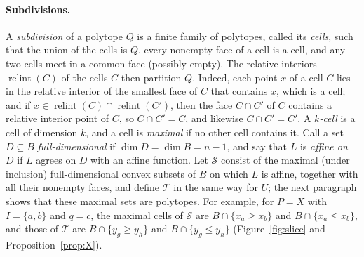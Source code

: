 \documentclass[11pt]{article}
\theoremstyle{definition}
\theoremstyle{remark}
\newcommand{\SSS}{\mathcal S}
\newcommand{\TT}{\mathcal T}
\newcommand{\relint}{\operatorname{relint}}
\begin{document}
\paragraph{Subdivisions.}
A \emph{subdivision} of a polytope $Q$ is a finite family of polytopes, called its \emph{cells}, such that the union of the cells is $Q$, every nonempty face of a cell is a cell, and any two cells meet in a common face (possibly empty). The relative interiors $\relint(C)$ of the cells $C$ then partition $Q$. Indeed, each point $x$ of a cell $C$ lies in the relative interior of the smallest face of $C$
that contains $x$, which is a cell; and if $x\in\relint(C)\cap\relint(C')$, then the face $C\cap C'$ of $C$
contains a relative interior point of $C$, so $C\cap C'=C$, and likewise $C\cap C'=C'$. A \emph{$k$-cell} is a
cell of dimension $k$, and a cell is \emph{maximal} if no other cell contains it. Call a set $D\subseteq B$ \emph{full-dimensional} if
$\dim D=\dim B=n-1$, and say that $L$ is \emph{affine on} $D$ if $L$ agrees on $D$ with an affine function. Let
$\SSS$ consist of the maximal (under inclusion) full-dimensional convex subsets of $B$ on which $L$ is affine,
together with all their nonempty faces, and
define $\TT$ in the same way for $U$; the next paragraph shows that these maximal sets are polytopes.
For example, for $P=X$ with $I=\{a,b\}$ and $q=c$, the maximal cells of $\SSS$ are $B\cap\{x_a\geq x_b\}$ and $B\cap\{x_a\leq x_b\}$,
and those of $\TT$ are $B\cap\{y_g\geq y_h\}$ and $B\cap\{y_g\leq y_h\}$ (Figure~\ref{fig:slice} and
Proposition~\ref{prop:X}).
\end{document}
